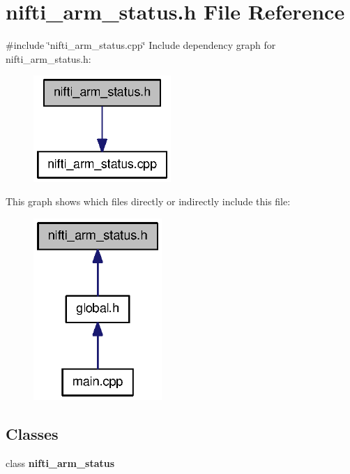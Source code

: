 \section{nifti\-\_\-arm\-\_\-status.\-h \-File \-Reference}
\label{nifti__arm__status_8h}
{\ttfamily \#include \char`\"{}nifti\-\_\-arm\-\_\-status.\-cpp\char`\"{}}\*
\-Include dependency graph for nifti\-\_\-arm\-\_\-status.\-h\-:
\nopagebreak
\begin{figure}[H]
\begin{center}
\leavevmode
\includegraphics[width=148pt]{nifti__arm__status_8h__incl}
\end{center}
\end{figure}
\-This graph shows which files directly or indirectly include this file\-:
\nopagebreak
\begin{figure}[H]
\begin{center}
\leavevmode
\includegraphics[width=138pt]{nifti__arm__status_8h__dep__incl}
\end{center}
\end{figure}
\subsection*{\-Classes}
\begin{DoxyCompactItemize}
\item 
class {\bf nifti\-\_\-arm\-\_\-status}
\end{DoxyCompactItemize}
